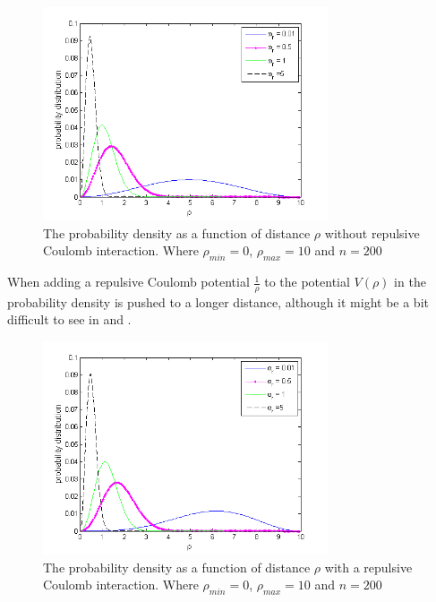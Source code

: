 \begin{figure}[H]
	\centering
	\includegraphics[width=0.75\textwidth]{Figures/2particles_without.png}
	\caption{The probability density as a function of distance $\rho$ without repulsive Coulomb interaction. Where $\rho_{min} = 0$, $\rho_{max} = 10$ and $n = 200$  }
	\label{fig:ProbFuncOmegaWithout}
\end{figure}

When adding a repulsive Coulomb potential $\frac{1}{\rho}$ to the potential $V(\rho )$ in  the probability density is pushed to a longer distance, although it might be a bit difficult to see in  and .

\begin{figure}[H]
	\centering
	\includegraphics[width=0.75\textwidth]{Figures/ProbFuncOmega.png}
	\caption{The probability density as a function of distance $\rho$ with a repulsive Coulomb interaction. Where $\rho_{min} = 0$, $\rho_{max} = 10$ and $n = 200$}
	\label{fig:ProbFuncOmega}
\end{figure}





